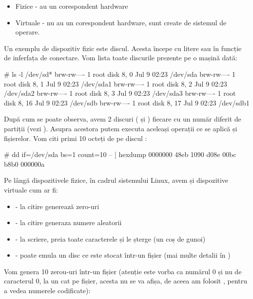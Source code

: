 \begin{itemize}
	\item Fizice - au un corespondent hardware
	\item Virtuale - nu au un corespondent hardware, sunt create de sistemul de operare.
\end{itemize}

Un exemplu de dispozitiv fizic este discul. Acesta începe cu litere 
sau  în funcție de inferfața de conectare. Vom lista toate discurile
prezente pe o mașină dată:

\begin{screen}
# ls -l /dev/sd*
brw-rw---- 1 root disk 8,  0 Jul  9 02:23 /dev/sda
brw-rw---- 1 root disk 8,  1 Jul  9 02:23 /dev/sda1
brw-rw---- 1 root disk 8,  2 Jul  9 02:23 /dev/sda2
brw-rw---- 1 root disk 8,  3 Jul  9 02:23 /dev/sda3
brw-rw---- 1 root disk 8, 16 Jul  9 02:23 /dev/sdb
brw-rw---- 1 root disk 8, 17 Jul  9 02:23 /dev/sdb1
\end{screen}

După cum se poate observa, avem 2 discuri ( și ) fiecare cu
un număr diferit de partiții (vezi ).
Asupra acestora putem executa aceleași operații ce se aplică și fișierelor. Vom
citi primi 10 octeți de pe discul :

\begin{screen}
# dd if=/dev/sda bs=1 count=10 -- | hexdump
0000000 48eb 1090 d08e 00bc b8b0
000000a
\end{screen}

Pe lângă dispozitivele fizice, în cadrul sistemului Linux, avem și dispozitive
virtuale cum ar fi:

\begin{itemize}
	\item {} - la citire generează zero-uri
	\item {} - la citire generaza numere aleatorii
	\item {} - la scriere, preia toate caracterele și le
		șterge (un coș de gunoi)
	\item {} - poate emula un disc ce este stocat într-un
		fișier (mai multe detalii în
		)
\end{itemize}

Vom genera 10 zerou-uri într-un fișier (atenție este vorba ca numărul 0 și nu de
caracterul 0, la un cat pe fișier, acesta nu se va afișa, de aceea am folosit
, pentru a vedea numerele codificate):

